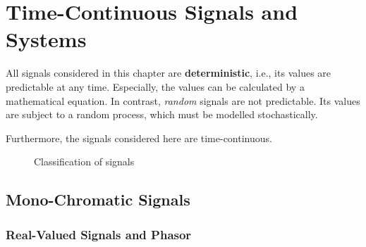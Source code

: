 %
%
%

\chapter{Time-Continuous Signals and Systems}

\begin{refsection}

All signals considered in this chapter are  \textbf{deterministic}, i.e., its values are predictable at any time. Especially, the values can be calculated by a mathematical equation. In contrast, \emph{random} signals are not predictable. Its values are subject to a random process, which must be modelled stochastically.

Furthermore, the signals considered here are time-continuous.

\begin{figure}[H]
	\centering
	\caption{Classification of signals}
	\label{fig:ch02:timecont_signals_classif}
\end{figure}

\section{Mono-Chromatic Signals}

\subsection{Real-Valued Signals and Phasor}


\end{refsection}
